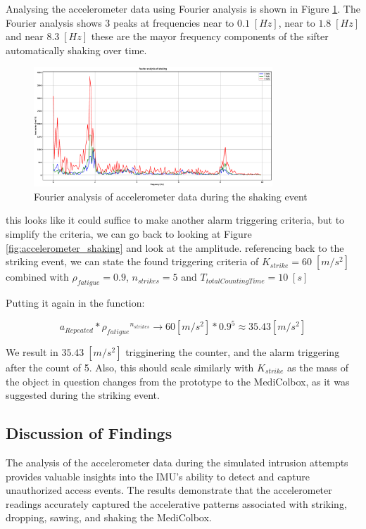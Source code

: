 \documentclass[../main.tex]{subfiles}
\begin{document}
Analysing the accelerometer data using Fourier analysis is shown in
Figure \ref{fig:fourier_accelerometer_shaking}.
The Fourier analysis shows $3$ peaks at frequencies
near to $0.1\;[Hz]$, near to $1.8\;[Hz]$ and near $8.3\;[Hz]$ these are the mayor frequency components of the sifter automatically shaking over time.


\begin{figure}[htbp]
    \centering
    \includegraphics[width=0.8\textwidth]{resources/figures/Fourier_acceleration_shaking.eps}
    \caption{Fourier analysis of accelerometer data during the shaking event}
    \label{fig:fourier_accelerometer_shaking}
\end{figure}

this looks like it could suffice to make another alarm triggering criteria,
but to simplify the criteria,
we can go back to looking at Figure \ref{fig:accelerometer_shaking} and
look at the amplitude.
referencing back to the striking event,
we can state the found triggering criteria of
$K_{strike} = 60\;[m/s^2]$ combined with
$\rho_{fatigue} = 0.9$, $n_{strikes}=5$
and $T_{totalCountingTime}=10\;[s]$

Putting it again in the function:

$$a_{Repeated} * {\rho_{fatigue}}^{n_{strikes}} \rightarrow 60 [m/s^2] * 0.9^5 \approx 35.43 [m/s^2] $$

We result in $35.43\;[m/s^2]$ trigginering the counter, and the alarm triggering after the count of 5. Also, this should scale similarly with $K_{strike}$ as the mass of the object in question changes from the prototype to the MediColbox, as it was suggested during the striking event.

\subsection{Discussion of Findings}

The analysis of the accelerometer data during the
simulated intrusion attempts provides valuable insights into the
IMU's ability to detect and capture unauthorized access events.
The results demonstrate that the
accelerometer readings accurately captured the
accelerative patterns associated with striking,
dropping, sawing, and shaking the MediColbox.
\end{document}
